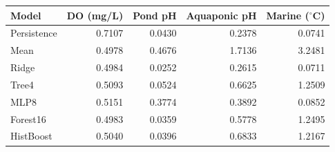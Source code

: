 \begin{tabular}{lrrrr}
\toprule
Model & DO (mg/L) & Pond pH & Aquaponic pH & Marine ($^\circ$C) \\
\midrule
Persistence & 0.7107 & 0.0430 & 0.2378 & 0.0741 \\
Mean & 0.4978 & 0.4676 & 1.7136 & 3.2481 \\
Ridge & 0.4984 & 0.0252 & 0.2615 & 0.0711 \\
Tree4 & 0.5093 & 0.0524 & 0.6625 & 1.2509 \\
MLP8 & 0.5151 & 0.3774 & 0.3892 & 0.0852 \\
Forest16 & 0.4983 & 0.0359 & 0.5778 & 1.2495 \\
HistBoost & 0.5040 & 0.0396 & 0.6833 & 1.2167 \\
\bottomrule
\end{tabular}